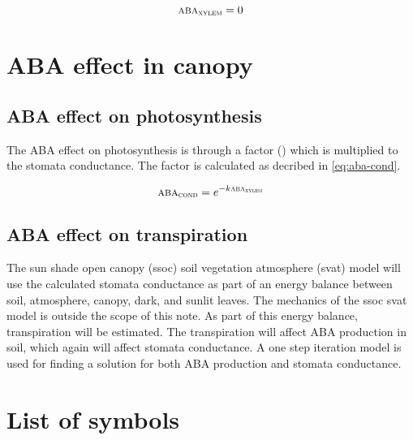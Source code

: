 \documentclass[a4paper,11pt,twoside]{article}
\newcommand{\aba}[1]{\text{\textsc{aba}$_\text{\textsc{#1}}$}}
\begin{document}
\begin{equation}
  \aba{xylem} = 0
  \label{eq:aba_none}
\end{equation}

\section{ABA effect in canopy}

\subsection{ABA effect on photosynthesis}

The ABA effect on photosynthesis is through a factor (\aba{cond})
which is multiplied to the stomata conductance.  The factor is
calculated as decribed in \eqref{eq:aba-cond}.

\begin{equation}
  \aba{cond} = e^{-k \aba{xylem}}
  \label{eq:aba-cond}
\end{equation}

\subsection{ABA effect on transpiration}

The sun shade open canopy (ssoc) soil vegetation atmosphere (svat)
model will use the calculated stomata conductance as part of an energy
balance between soil, atmosphere, canopy, dark, and sunlit leaves.
The mechanics of the ssoc svat model is outside the scope of this
note.  As part of this energy balance, transpiration will be
estimated.  The transpiration will affect ABA production in soil,
which again will affect stomata conductance.  A one step iteration
model is used for finding a solution for both ABA production and
stomata conductance.

\section{List of symbols}
\end{document}
